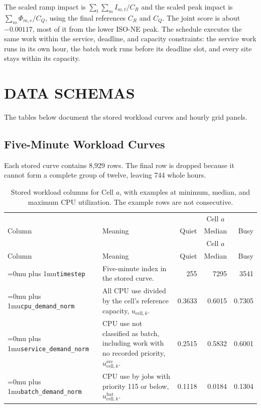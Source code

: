\documentclass{UNCC-thesis}
\newcommand{\codepath}[1]{{\Urlmuskip=0mu plus 1mu\relax\nolinkurl{#1}}}
\begin{document}
The scaled ramp impact is \(\sum_t\sum_m I_{m,t}/C_R\) and the scaled peak impact is
\(\sum_m\Phi_{m,e}/C_Q\), using the final references \(C_R\) and \(C_Q\). The joint score is
about \(-0.00117\), most of it from the lower
ISO-NE peak. The schedule executes the same work within the service, deadline, and
capacity constraints: the service work runs in its own hour, the batch work runs before
its deadline slot, and every site stays within its capacity.

\chapter{DATA SCHEMAS}
\label{app:data-schemas}

The tables below document the stored workload curves and hourly grid panels.

\section{Five-Minute Workload Curves}
Each stored curve contains 8,929 rows. The final row is dropped because it
cannot form a complete group of twelve, leaving 744 whole hours.

\begingroup
\small
\singlespacing
\begin{longtable}{@{}L{0.22\textwidth}L{0.39\textwidth}rrr@{}}
\caption[Stored workload columns for Cell \(a\)]{Stored workload columns for Cell \(a\), with examples at minimum,
  median, and maximum CPU utilization. The example rows are not consecutive.}
  \label{tab:clusterdata-tier-columns}\\
    \toprule
     & &  \\
    \cmidrule(l){3-5}
    Column & Meaning & Quiet & Median & Busy \\
    \midrule
  \endfirsthead
    \toprule
     & &  \\
    \cmidrule(l){3-5}
    Column & Meaning & Quiet & Median & Busy \\
    \midrule
  \endhead
    \codepath{timestep}
      & Five-minute index in the stored curve.
      & 255 & 7295 & 3541 \\
    \addlinespace
    \codepath{cpu_demand_norm}
      & All CPU use divided by the cell's reference capacity,
        \(u_{\mathrm{cell},k}\).
      & 0.3633 & 0.6015 & 0.7305 \\
    \addlinespace
    \codepath{service_demand_norm}
      & CPU use not classified as batch, including work with no recorded
        priority, \(u^{\mathrm{svc}}_{\mathrm{cell},k}\).
      & 0.2515 & 0.5832 & 0.6001 \\
    \addlinespace
    \codepath{batch_demand_norm}
      & CPU use by jobs with priority 115 or below,
        \(u^{\mathrm{bat}}_{\mathrm{cell},k}\).
      & 0.1118 & 0.0184 & 0.1304 \\
    \bottomrule
\end{longtable}
\endgroup
\end{document}
